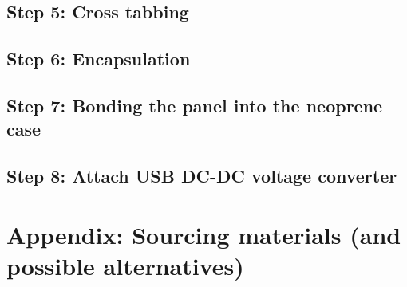 \documentclass{article}
\theoremstyle{definition}
\theoremstyle{definition}
\theoremstyle{remark}
\begin{document}

  \subsection{Step 5: Cross tabbing} %
  \label{sub:step_5_cross_tabbing}
  

  \subsection{Step 6: Encapsulation} %
  \label{sub:step_6_encapsulation}
  

  \subsection{Step 7: Bonding the panel into the neoprene case} %
  \label{sub:step_7_bonding_the_panel_into_the_neoprene_case}
  

  \subsection{Step 8: Attach USB DC-DC voltage converter} %
  \label{sub:step_8_attach_usb_dc_dc_voltage_converter}
  


\newpage

\section{Appendix: Sourcing materials (and possible alternatives)} %
\label{sec:appendix_sourcing_materials_and_possible_alternatives_}

\end{document}
